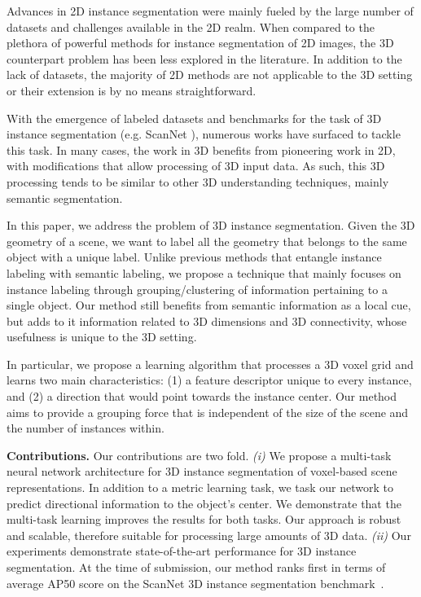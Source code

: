 \documentclass[10pt,twocolumn,letterpaper]{article}
\newcommand{\mysection}[1]{\vspace{3pt}\noindent\textbf{#1.}}
\begin{document}
Advances in 2D instance segmentation were mainly fueled by the large number of datasets and challenges available in the 2D realm. When compared to the plethora of powerful methods for instance segmentation of 2D images, the 3D counterpart problem has been less explored in the literature. In addition to the lack of datasets, the majority of 2D methods are not applicable to the 3D setting or their extension is by no means straightforward.

With the emergence of labeled datasets and benchmarks for the task of 3D instance segmentation (e.g. ScanNet \cite{Dai-et-al-CVPR-2017}), numerous works have surfaced to tackle this task. In many cases, the work in 3D benefits from pioneering work in 2D, with modifications that allow processing of 3D input data. As such, this 3D processing tends to be similar to other 3D understanding techniques, mainly semantic segmentation.

In this paper, we address the problem of 3D instance segmentation. Given the 3D geometry of a scene, we want to label all the geometry that belongs to the same object with a unique label. 
Unlike previous methods that entangle instance labeling with semantic labeling, we propose a technique that mainly focuses on instance labeling through grouping/clustering of information pertaining to a single object.
Our method still benefits from semantic information as a local cue, but adds to it information related to 3D dimensions and 3D connectivity, whose usefulness is unique to the 3D setting.

In particular, we propose a learning algorithm that processes a 3D voxel grid and learns two main characteristics: (1) a feature descriptor unique to every instance, and (2) a direction that would point towards the instance center. Our method aims to provide a grouping force that is independent of the size of the scene and the number of instances within. 


\mysection{Contributions} Our contributions are two fold. \emph{(i)} We propose a multi-task neural network architecture for 3D instance segmentation of voxel-based scene representations. In addition to a metric learning task, we task our network to predict directional information to the object's center. We demonstrate that the multi-task learning improves the results for both tasks. Our approach is robust and scalable, therefore suitable for processing large amounts of 3D data. \emph{(ii)} Our experiments demonstrate state-of-the-art performance for 3D instance segmentation. At the time of submission, our method ranks first in terms of average AP50 score on the ScanNet 3D instance segmentation benchmark~\cite{Dai-et-al-CVPR-2017}.
\end{document}
